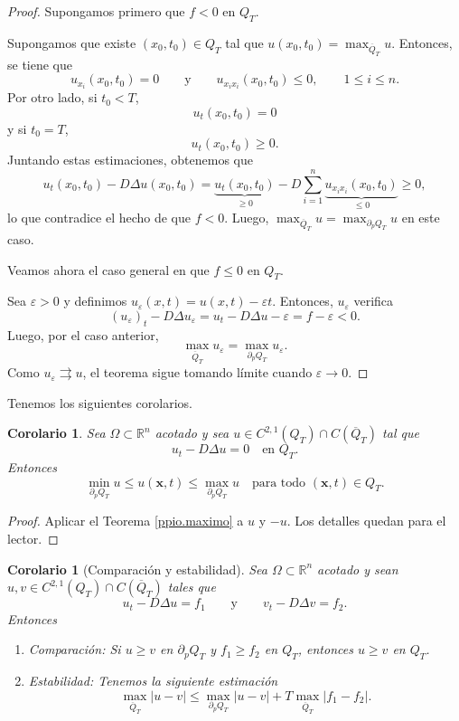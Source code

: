 \documentclass[12pt, a4paper]{amsbook}
\newcommand{\ve}{\varepsilon}
\newcommand{\R}{{\mathbb R}}
\newcommand{\xx}{{\mathbf x}}
\newtheorem{cor}[teo]{Corolario}
\theoremstyle{remark}
\theoremstyle{definition}
\numberwithin{section}{chapter}
\numberwithin{subsection}{section}
\numberwithin{equation}{section}
\numberwithin{figure}{chapter}
\begin{document}
\begin{proof}
Supongamos primero que $f<0$ en $Q_T$.

Supongamos que existe $(x_0, t_0)\in Q_T$ tal que $u(x_0, t_0)=\max_{\overline{Q}_T} u$. Entonces, se tiene que
$$
u_{x_i}(x_0, t_0)=0\qquad\text{y}\qquad u_{x_i x_i}(x_0, t_0)\le 0,\qquad 1\le i\le n.
$$
Por otro lado, si $t_0<T$,
$$
u_t(x_0, t_0) = 0
$$
y si $t_0=T$,
$$
u_t(x_0, t_0)\ge 0.
$$
Juntando estas estimaciones, obtenemos que
$$
u_t(x_0, t_0) - D\Delta u(x_0, t_0) = \underbrace{u_t(x_0, t_0)}_{\ge 0} - D\sum_{i=1}^n \underbrace{u_{x_i x_i}(x_0, t_0)}_{\le 0} \ge 0,
$$
lo que contradice el hecho de que $f<0$. Luego, $\max_{\overline{Q}_T} u = \max_{\partial_p Q_T} u$ en este caso.

Veamos ahora el caso general en que $f\le 0$ en $Q_T$. 

Sea $\ve>0$ y definimos $u_\ve(x, t) = u(x, t)-\ve t$. Entonces, $u_\ve$ verifica
$$
(u_\ve)_t - D\Delta u_\ve = u_t - D\Delta u - \ve = f - \ve< 0.
$$
Luego, por el caso anterior,
$$
\max_{\overline{Q}_T} u_\ve = \max_{\partial_p Q_T} u_\ve.
$$
Como $u_\ve\rightrightarrows u$, el teorema sigue tomando límite cuando $\ve\to 0$.
\end{proof}

Tenemos los siguientes corolarios.

\begin{cor}
Sea $\Omega\subset\R^n$ acotado y sea $u\in C^{2,1}(Q_T)\cap C(\overline{Q}_T)$ tal que
$$
u_t - D\Delta u = 0\quad \text{en } Q_T.
$$
Entonces
$$
\min_{\partial_p Q_T} u \le u(\xx, t)\le \max_{\partial_p Q_T} u\quad \text{para todo }(\xx, t)\in Q_T.
$$
\end{cor}

\begin{proof}
Aplicar el Teorema \ref{ppio.maximo} a $u$ y $-u$. Los detalles quedan para el lector.
\end{proof}

\begin{cor}[Comparación y estabilidad]
Sea $\Omega\subset\R^n$ acotado y sean $u, v\in C^{2,1}(Q_T)\cap C(\overline{Q}_T)$ tales que
$$
u_t - D\Delta u = f_1\qquad \text{y}\qquad v_t - D\Delta v = f_2.
$$
Entonces
\begin{enumerate}
\item Comparación: Si $u\ge v$ en $\partial_p Q_T$ y $f_1\ge f_2$ en $Q_T$, entonces $u\ge v$ en $Q_T$.

\item Estabilidad: Tenemos la siguiente estimación
$$
\max_{\overline Q_T} |u-v|\le \max_{\partial_p Q_T} |u-v| + T\max_{\overline Q_T} |f_1 - f_2|.
$$
\end{enumerate}
\end{cor}
\end{document}
